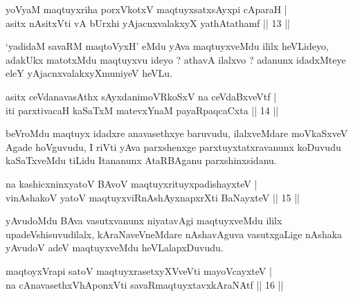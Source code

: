 \begin{shl}
yoV\s yaM maqtuyxriha porxVkotxV maqtuyxsatxsAyxpi cAparaH |\\
asitx nAsitxVti vA bUrxhi yAjacnxvalakxyX yathAtathamf \hfill || 13 ||
\end{shl}

\begin{artha}
`yadidaM savaRM maqtoVyxH' eMdu yAva maqtuyxveMdu ililx heVLideyo, adakUkx matotxMdu maqtuyxvu ideyo ? athavA ilalxvo ? adanunx idadxMteye eleY yAjacnxvalakxyXmuniyeV heVLu.
\end{artha}

\begin{shl}
asitx ceVdanavasAthx sAyxdanimoVRkoSxV na ceVdaBxveVtf |\\
iti parxtivacaH kaSaTxM matevxYnaM payaRpaqcaCxta \hfill || 14 ||
\end{shl}

\begin{artha}
beVroMdu maqtuyx idadxre anavasethxye baruvudu, ilalxveMdare moVkaSxveV Agade hoVguvudu, I riVti yAva parxshenxge parxtuyxtatxravanunx koDuvudu kaSaTxveMdu tiLidu Itananunx AtaRBAganu parxshinxsidanu.
\end{artha}




\begin{shl}
na kashicxninxyatoV BAvoV maqtuyxrituyxpadishayxteV |\\
vinAshakoV yatoV maqtuyxviRnAshAyxnapxrXti BaNayxteV \hfill || 15 ||
\end{shl}

\begin{artha}
yAvudoMdu BAva vasutxvanunx niyatavAgi maqtuyxveMdu ililx upadeVshisuvudilalx, 
kAraNaveVneMdare nAshavAguva vasutxgaLige nAshaka yAvudoV adeV maqtuyxveMdu heVLalapxDuvudu.
\end{artha}


\begin{shl}
maqtoyxVrapi satoV maqtuyxrasetxyXVveVti mayoVcayxteV |\\
na cAnavasethxVhA\s \s ponxVti savaRmaqtuyxtavxkAraNAtf \hfill || 16 ||
\end{shl}

